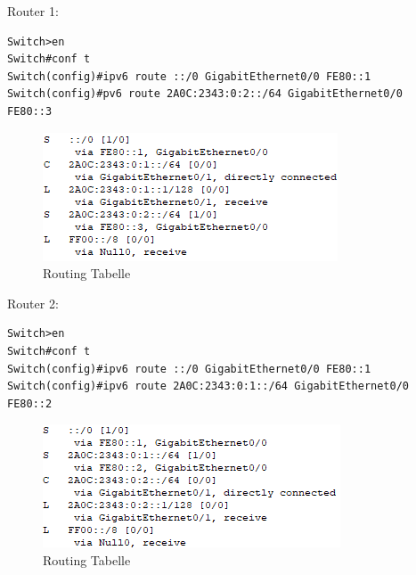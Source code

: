 \noindent
Router 1:
\begin{lstlisting}
Switch>en
Switch#conf t
Switch(config)#ipv6 route ::/0 GigabitEthernet0/0 FE80::1
Switch(config)#pv6 route 2A0C:2343:0:2::/64 GigabitEthernet0/0
FE80::3
\end{lstlisting}
\begin{figure}[!htb]
    \centering
    \includegraphics[width=\textwidth,height=.75\textwidth,keepaspectratio]{./routing/ipv6_1.png}
    \caption{Routing Tabelle}
\end{figure}

\noindent
Router 2:
\begin{lstlisting}
Switch>en
Switch#conf t
Switch(config)#ipv6 route ::/0 GigabitEthernet0/0 FE80::1
Switch(config)#ipv6 route 2A0C:2343:0:1::/64 GigabitEthernet0/0
FE80::2
\end{lstlisting}
\begin{figure}[!htb]
    \centering
    \includegraphics[width=\textwidth,height=.75\textwidth,keepaspectratio]{./routing/ipv6_2.png}
    \caption{Routing Tabelle}
\end{figure}

